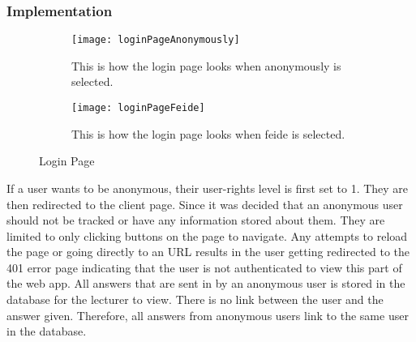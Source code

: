\subsubsection{Implementation}
\begin{figure}[H]
    \centering
    \begin{subfigure}{0.45\linewidth}
        \texttt{[image: loginPageAnonymously]}
        \caption{This is how the login page looks when anonymously is selected.}
        \label{fig:loginPageAnonoumsly}
    \end{subfigure}
    \begin{subfigure}{0.45\linewidth}
        \texttt{[image: loginPageFeide]}
        \caption{This is how the login page looks when feide is selected.}
        \label{fig:loginPageFeide}
    \end{subfigure}
    \caption{Login Page}
    \label{fig:loginPage}
\end{figure}
\noindent
If a user wants to be anonymous, their user-rights level is first set to 1. They are then redirected to the client page. Since it was decided that an anonymous user should not be tracked or have any information stored about them. They are limited to only clicking buttons on the page to navigate. Any attempts to reload the page or going directly to an URL results in the user getting redirected to the 401 error page indicating that the user is not authenticated to view this part of the web app. All answers that are sent in by an anonymous user is stored in the database for the lecturer to view. There is no link between the user and the answer given. Therefore, all answers from anonymous users link to the same user in the database.
\\[11pt]
